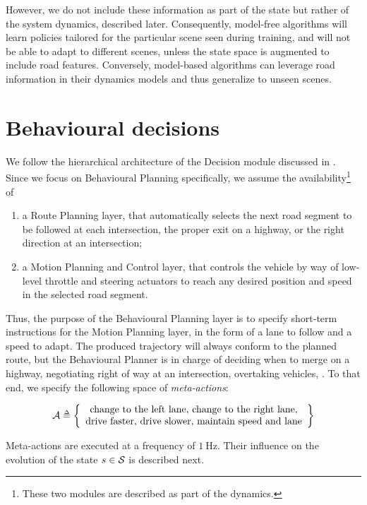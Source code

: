 However, we do not include these information as part of the state but rather of the system dynamics, described later. Consequently, model-free algorithms will learn policies tailored for the particular scene seen during training, and will not be able to adapt to different scenes, unless the state space is augmented to include road features. Conversely, model-based algorithms can leverage road information in their dynamics models and thus generalize to unseen scenes.

\section{Behavioural decisions}

We follow the hierarchical architecture of the Decision module discussed in . Since we focus on Behavioural Planning specifically, we assume the availability\footnote{These two modules are described as part of the dynamics.} of
\begin{enumerate}[label=(\roman*)]
	\item a Route Planning layer, that automatically selects the next road segment to be followed at each intersection, \eg the proper exit on a highway, or the right direction at an intersection;
	\item a Motion Planning and Control layer, that controls the vehicle by way of low-level throttle and steering actuators to reach any desired position and speed in the selected road segment. 
\end{enumerate}

Thus, the purpose of the Behavioural Planning layer is to specify short-term instructions for the Motion Planning layer, in the form of a lane to follow and a speed to adapt. The produced trajectory will always conform to the planned route, but the Behavioural Planner is in charge of \eg deciding when to merge on a highway, negotiating right of way at an intersection, overtaking vehicles, \etc. To that end, we specify the following space of \emph{meta-actions}:

\[
\cA \eqdef \left\{ \begin{array}{c}
\text{change to the left lane},\, \text{change to the right lane}, \\
\text{drive faster},\, \text{drive slower},\, \text{maintain speed and lane}
\end{array}\right\}
\]

Meta-actions are executed at a frequency of $\SI{1}{\hertz}$. Their influence on the evolution of the state $s\in\mathcal{S}$ is described next.

